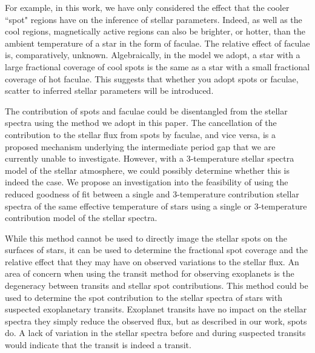 For example, in this work, we have only considered the effect that the cooler ``spot" regions have on the inference of stellar parameters.
Indeed, as well as the cool regions, magnetically active regions can also be brighter, or hotter, than the ambient temperature of a star in the form of faculae.
The relative effect of faculae is, comparatively, unknown.
Algebraically, in the model we adopt, a star with a large fractional coverage of cool spots is the same as a star with a small fractional coverage of hot faculae.
This suggests that whether you adopt spots or faculae, scatter to inferred stellar parameters will be introduced.

The contribution of spots and faculae could be disentangled from the stellar spectra using the method we adopt in this paper.
The cancellation of the contribution to the stellar flux from spots by faculae, and vice versa, is a proposed mechanism underlying the intermediate period gap that we are currently unable to investigate.
However, with a 3-temperature stellar spectra model of the stellar atmosphere, we could possibly determine whether this is indeed the case.
We propose an investigation into the feasibility of using the reduced goodness of fit between a single and 3-temperature contribution stellar spectra of the same effective temperature of stars using a single or 3-temperature contribution model of the stellar spectra.

While this method cannot be used to directly image the stellar spots on the surfaces of stars, it can be used to determine the fractional spot coverage and the relative effect that they may have on observed variations to the stellar flux.
An area of concern when using the transit method for observing exoplanets is the degeneracy between transits and stellar spot contributions.
This method could be used to determine the spot contribution to the stellar spectra of stars with suspected exoplanetary transits.
Exoplanet transits have no impact on the stellar spectra they simply reduce the observed flux, but as described in our work, spots do.
A lack of variation in the stellar spectra before and during suspected transits would indicate that the transit is indeed a transit.

